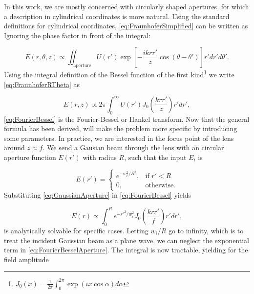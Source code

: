\vspace*{3mm}

\noindent In this work, we are mostly concerned with circularly shaped apertures, for which a description in cylindrical coordinates is more natural.
Using the standard definitions for cylindrical coordinates, \cref{eq:FraunhoferSimplified} can be written as
 Ignoring the phase factor in front of the integral:

\begin{equation}\label{eq:FraunhoferRTheta}
    E(r,\theta, z) \propto \iint_{\text{aperture}} U(r') \exp{\left[
    -\frac{i k r r'}{z} \cos{(\theta-\theta')} 
    \right]}r'dr'd\theta'.
\end{equation}
Using the integral definition of the Bessel function of the first kind\footnote{$J_0(x) = \frac{1}{2\pi} \int_0^{2\pi} \exp{(i x \cos{\alpha})} d\alpha$} we write \cref{eq:FraunhoferRTheta} as 

\begin{equation}\label{eq:FourierBessel}
    E(r,z) \propto 2\pi \int_0^{\infty} U(r') J_0\left( \frac{k r r'}{z}\right) r'dr',
\end{equation}
\cref{eq:FourierBessel} is the Fourier-Bessel or Hankel transform.
Now that the general formula has been derived, will make the problem more specific by introducing some parameters. 
In practice, we are interested in the focus point of the lens around $z \approx f$. 
We send a Gausian beam through the lens with an circular aperture function $E(r')$ with radius $R$, such that the input $E_i$ is

\begin{equation}\label{eq:GaussianAperture}
    E(r')=
    \begin{cases}
        e^{- w_i^2/R^2},& \text{if } r' < R\\
        0,               & \text{otherwise}.
    \end{cases}
\end{equation}
Substituting \cref{eq:GaussianAperture} in \cref{eq:FourierBessel} yields

\begin{equation}\label{eq:FourierBesselAperture}
    E(r) \propto \int_0^R e^{-r'^2/w_i^2} J_0\left(\frac{k r r'}{f}\right)r'dr',
\end{equation}
 is analytically solvable for specific cases.
Letting $w_i/R$ go to infinity, which is to treat the incident Gaussian beam as a plane wave, we can neglect the exponential term in \cref{eq:FourierBesselAperture}. 
The integral is now tractable, yielding for the field amplitude

